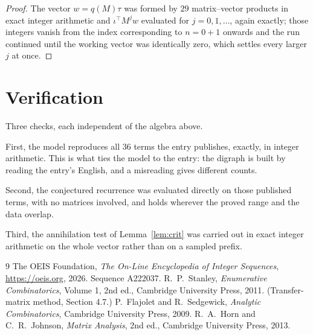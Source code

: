 \documentclass[11pt,a4paper]{article}
\theoremstyle{plain}
\theoremstyle{definition}
\begin{document}
\begin{proof}
The vector $w=q(M)\tau$ was formed by $29$ matrix--vector products in exact integer
arithmetic and $\iota^{\!\top}M^{j}w$ evaluated for $j=0,1,\dots$, again exactly; those
integers vanish from the index corresponding to $n=0+1$ onwards and the run continued
until the working vector was identically zero, which settles every larger $j$ at once.
\end{proof}

\section{Verification}

Three checks, each independent of the algebra above.

First, the model reproduces all $36$ terms the entry publishes, exactly, in integer
arithmetic. This is what ties the model to the entry: the digraph is built by reading the
entry's English, and a misreading gives different counts.

Second, the conjectured recurrence was evaluated directly on those published terms, with no
matrices involved, and holds wherever the proved range and the data overlap.

Third, the annihilation test of Lemma~\ref{lem:crit} was carried out in exact integer
arithmetic on the whole vector rather than on a sampled prefix.

\begin{thebibliography}{9}
 The OEIS Foundation, \emph{The On-Line Encyclopedia of Integer
Sequences}, \url{https://oeis.org}, 2026. Sequence A222037.
 R.~P.~Stanley, \emph{Enumerative Combinatorics}, Volume 1, 2nd ed.,
Cambridge University Press, 2011. (Transfer-matrix method, Section 4.7.)
 P.~Flajolet and R.~Sedgewick, \emph{Analytic Combinatorics}, Cambridge
University Press, 2009.
 R.~A.~Horn and C.~R.~Johnson, \emph{Matrix Analysis}, 2nd ed., Cambridge
University Press, 2013.
\end{thebibliography}
\end{document}
